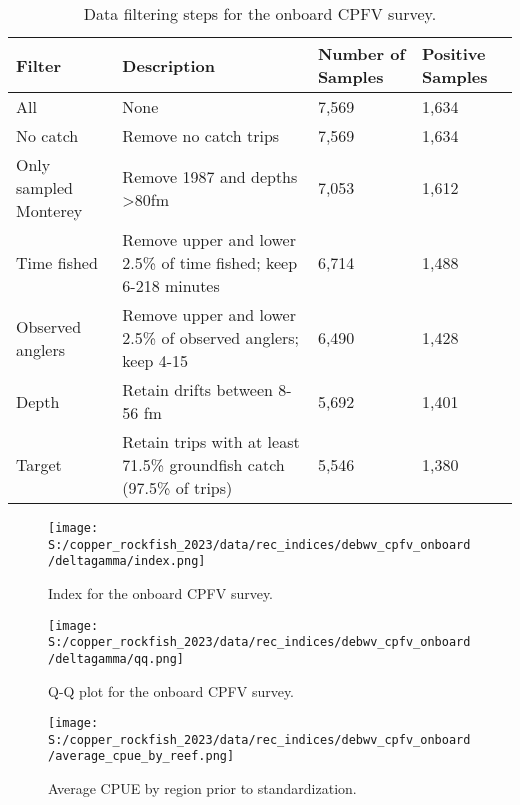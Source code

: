 \documentclass[11pt,
  letterpaper,
]{article}
\begin{document}
\begin{landscape}\begin{table}[H]
\centering
\caption{\label{tab:deb-filter}Data filtering steps for the onboard CPFV survey.}
\centering
\fontsize{9}{11}\selectfont
\fontsize{9}{11}\selectfont
\begin{tabular}[t]{l>{\raggedright\arraybackslash}p{8cm}ll}
\toprule
Filter & Description & Number of Samples & Positive Samples\\
\midrule
All & None & 7,569 & 1,634\\
No catch & Remove no catch trips & 7,569 & 1,634\\
Only sampled Monterey & Remove 1987 and depths >80fm & 7,053 & 1,612\\
Time fished & Remove upper and lower 2.5\% of time fished; keep 6-218 minutes & 6,714 & 1,488\\
Observed anglers & Remove upper and lower 2.5\% of observed anglers; keep 4-15 & 6,490 & 1,428\\
Depth & Retain drifts between 8-56 fm & 5,692 & 1,401\\
Target & Retain trips with at least 71.5\% groundfish catch (97.5\% of trips) & 5,546 & 1,380\\
\bottomrule
\end{tabular}
\end{table}
\end{landscape}

\begin{figure}
{\centering
\texttt{[image: S:/copper\_rockfish\_2023/data/rec\_indices/debwv\_cpfv\_onboard/deltagamma/index.png]}
}
\caption{Index for the onboard CPFV survey.\label{fig:deb-index}}
\end{figure}

\begin{figure}
{\centering
\texttt{[image: S:/copper\_rockfish\_2023/data/rec\_indices/debwv\_cpfv\_onboard/deltagamma/qq.png]}
}
\caption{Q-Q plot for the onboard CPFV survey.\label{fig:deb-qq}}
\end{figure}

\begin{figure}
{\centering
\texttt{[image: S:/copper\_rockfish\_2023/data/rec\_indices/debwv\_cpfv\_onboard/average\_cpue\_by\_reef.png]}
}
\caption{Average CPUE by region prior to standardization.\label{fig:deb-regioncpue}}
\end{figure}
\end{document}
